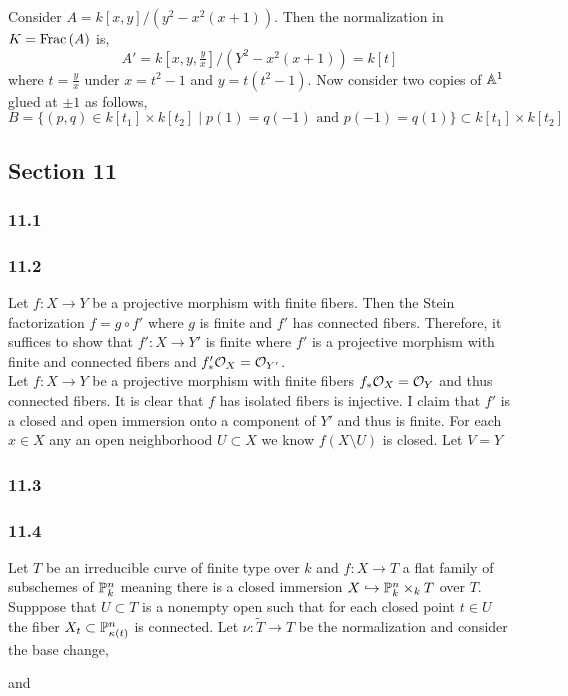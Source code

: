 \documentclass[12pt]{article}
\begin{document}
Consider $A = k[x,y]/(y^2 - x^2(x + 1))$. Then the normalization in $K = \Frac{A}$ is,
\[ A' = k[x,y,\tfrac{y}{x}]/(Y^2 - x^2(x + 1)) = k[t] \]
where $t = \frac{y}{x}$ under $x = t^2 - 1$ and $y = t(t^2 - 1)$. Now consider two copies of $\A^1$ glued at $\pm 1$ as follows,
\[ B = \{ (p, q) \in k[t_1] \times k[t_2] \mid p(1) = q(-1) \text{ and } p(-1) = q(1) \} \subset k[t_1] \times k[t_2] \]

\subsection{Section 11}


\subsubsection{11.1}

\subsubsection{11.2}

Let $f : X \to Y$ be a projective morphism with finite fibers. Then the Stein factorization $f = g \circ f'$ where $g$ is finite and $f'$ has connected fibers. Therefore, it suffices to show that $f' : X \to Y'$ is finite where $f'$ is a projective morphism with finite and connected fibers and $f'_* \struct{X} = \struct{Y'}$.
\bigskip\\
Let $f : X \to Y$ be a projective morphism with finite fibers $f_* \struct{X} = \struct{Y}$ and thus connected fibers.
It is clear that $f$ has isolated fibers is injective. I claim that $f'$ is a closed and open immersion onto a component of $Y'$ and thus is finite. For each $x \in X$ any an open neighborhood $U \subset X$ we know $f(X \setminus U)$ is closed. Let $V = Y$


\subsubsection{11.3}

\subsubsection{11.4}

Let $T$ be an irreducible curve of finite type over $k$ and $f : X \to T$ a flat family of subschemes of $\P^n_k$ meaning there is a closed immersion $X \embed \P^n_k \times_k T$ over $T$. Supppose that $U \subset T$ is a nonempty open such that for each closed point $t \in U$ the fiber $X_t \subset \P^n_{\kappa(t)}$ is connected. Let $\nu : \tilde{T} \to T$ be the normalization and consider the base change,
\begin{center}
\end{center}
and 
\end{document}

